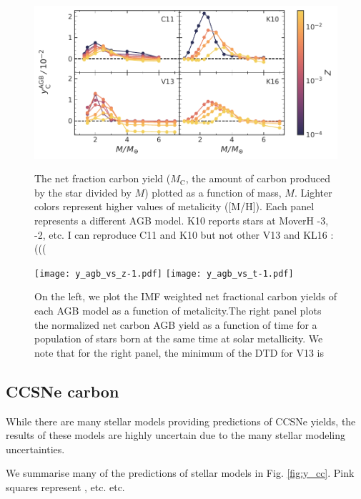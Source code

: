 \documentclass[fleqn,usenatbib]{mnras}
\begin{document}
\begin{figure}
    \centering
 	    \includegraphics[scale=1]{agb_yields.pdf}\\

    \caption{The net fraction carbon yield ($M_\text{C}$, the amount of carbon produced by the star divided by $M$) plotted as a function of mass, $M$. Lighter colors represent higher values of metalicity ([M/H]). Each panel represents a different AGB model. K10 reports stars at MoverH -3, -2, etc. I can reproduce C11 and K10 but not other V13 and KL16 :(((}

    \label{fig:y_agb}
\end{figure}

\begin{figure}
    \centering
    
    \texttt{[image: y\_agb\_vs\_z-1.pdf]}
    \texttt{[image: y\_agb\_vs\_t-1.pdf]}

    \caption{On the left, we plot the IMF weighted net fractional carbon yields of each AGB model as a function of metalicity.The right panel plots the normalized net carbon AGB yield as a function of time for a population of stars born at the same time at solar metallicity. We note that for the right panel, the minimum of the DTD for V13 is }

\end{figure}

\subsection{CCSNe carbon}


While there are many stellar models providing predictions of CCSNe yields, the results of these models are highly uncertain due to the many stellar modeling uncertainties. 

We summarise many of the predictions of stellar models in Fig. \ref{fig:y_cc}. Pink squares
represent \citep{NKT13}, etc. etc.
\citep{LC18}
\citep{sukhbold+16}
\citep{WW95}
\end{document}
